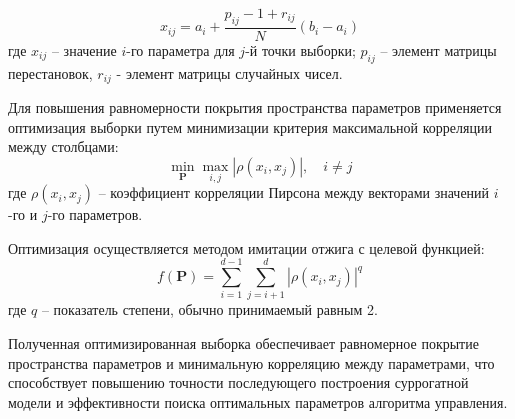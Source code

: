 \begin{equation}
x_{ij} = a_i + \frac{p_{ij} - 1 + r_{ij}}{N}(b_i - a_i)
\end{equation}
где $x_{ij}$ -- значение $i$-го параметра для $j$-й точки выборки;
$p_{ij}$ -- элемент матрицы перестановок, $r_{ij}$ - элемент матрицы случайных чисел.

Для повышения равномерности покрытия пространства параметров применяется
оптимизация выборки путем минимизации критерия максимальной корреляции между столбцами:
\begin{equation}
\min_{\mathbf{P}} \max_{i,j} |\rho(x_i, x_j)|, \quad i \neq j
\end{equation}
где $\rho(x_i, x_j)$ -- коэффициент корреляции Пирсона между векторами значений $i$-го и $j$-го параметров.

Оптимизация осуществляется методом имитации отжига с целевой функцией:
\begin{equation}
f(\mathbf{P}) = \sum_{i=1}^{d-1}\sum_{j=i+1}^d |\rho(x_i, x_j)|^q
\end{equation}
где $q$ -- показатель степени, обычно принимаемый равным 2.

Полученная оптимизированная выборка обеспечивает равномерное покрытие пространства
параметров и минимальную корреляцию между параметрами, что способствует повышению
точности последующего построения суррогатной модели и эффективности поиска оптимальных параметров алгоритма управления.